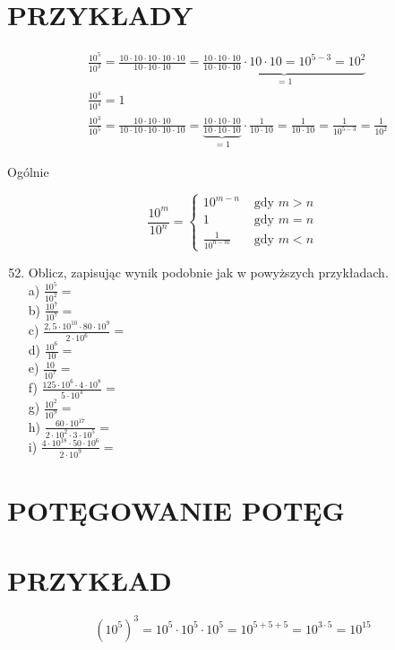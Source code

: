\documentclass[10pt]{article}
\begin{document}
\section*{PRZYKŁADY}
\[
\begin{aligned}
& \frac{10^{5}}{10^{3}}=\frac{10 \cdot 10 \cdot 10 \cdot 10 \cdot 10}{10 \cdot 10 \cdot 10}=\underbrace{\frac{10 \cdot 10 \cdot 10}{10 \cdot 10 \cdot 10} \cdot 10 \cdot 10=10^{5-3}=10^{2}}_{=1} \\
& \frac{10^{4}}{10^{4}}=1 \\
& \frac{10^{3}}{10^{5}}=\frac{10 \cdot 10 \cdot 10}{10 \cdot 10 \cdot 10 \cdot 10 \cdot 10}=\underbrace{\frac{10 \cdot 10 \cdot 10}{10 \cdot 10 \cdot 10}}_{=1} \cdot \frac{1}{10 \cdot 10}=\frac{1}{10 \cdot 10}=\frac{1}{10^{5-3}}=\frac{1}{10^{2}}
\end{aligned}
\]

Ogólnie

\[
\frac{10^{m}}{10^{n}}= \begin{cases}10^{m-n} & \text { gdy } m>n \\ 1 & \text { gdy } m=n \\ \frac{1}{10^{n-m}} & \text { gdy } m<n\end{cases}
\]

\begin{enumerate}
  \setcounter{enumi}{51}
  \item Oblicz, zapisując wynik podobnie jak w powyższych przykładach.\\
a) \(\frac{10^{5}}{10^{2}}=\)\\
b) \(\frac{10^{7}}{10^{7}}=\)\\
c) \(\frac{2,5 \cdot 10^{10} \cdot 80 \cdot 10^{9}}{2 \cdot 10^{6}}=\)\\
d) \(\frac{10^{6}}{10}=\)\\
e) \(\frac{10}{10^{7}}=\)\\
f) \(\frac{125 \cdot 10^{6} \cdot 4 \cdot 10^{8}}{5 \cdot 10^{4}}=\)\\
g) \(\frac{10^{2}}{10^{9}}=\)\\
h) \(\frac{60 \cdot 10^{17}}{2 \cdot 10^{2} \cdot 3 \cdot 10^{5}}=\)\\
i) \(\frac{4 \cdot 10^{18} \cdot 50 \cdot 10^{6}}{2 \cdot 10^{9}}=\)
\end{enumerate}

\section*{POTĘGOWANIE POTĘG}
\section*{PRZYKŁAD}
\[
\left(10^{5}\right)^{3}=10^{5} \cdot 10^{5} \cdot 10^{5}=10^{5+5+5}=10^{3 \cdot 5}=10^{15}
\]
\end{document}
